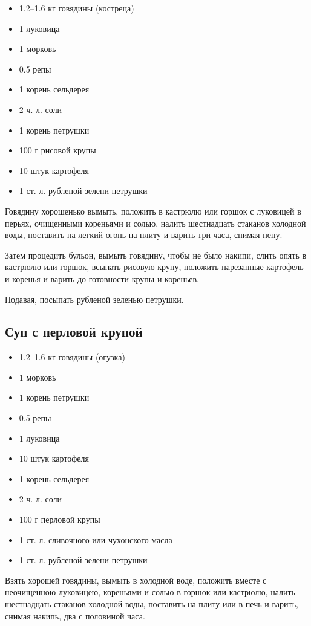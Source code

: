 \begin{itemize}
	\item 1.2–1.6 кг говядины (костреца) 
    \item 1 луковица  
    \item 1 морковь  
    \item 0.5 репы  
    \item 1 корень сельдерея  
    \item 2 ч. л. соли  
    \item 1 корень петрушки  
    \item 100 г рисовой крупы  
    \item 10 штук картофеля  
    \item 1 ст. л. рубленой зелени петрушки
\end{itemize}

Говядину хорошенько вымыть, положить в кастрюлю или горшок с луковицей в перьях, очищенными кореньями и солью, налить шестнадцать стаканов холодной воды, поставить на легкий огонь на плиту и варить три часа, снимая пену.

Затем процедить бульон, вымыть говядину, чтобы не было накипи, слить опять в кастрюлю или горшок, всыпать рисовую крупу, положить нарезанные картофель и коренья и варить до готовности крупы и кореньев.

Подавая, посыпать рубленой зеленью петрушки.

\subsection{Суп с перловой крупой}\label{12sup-perlov}

\begin{itemize}
	\item 1.2–1.6 кг говядины (огузка) 
	\item 1 морковь 
	\item 1 корень петрушки 
	\item 0.5 репы 
	\item 1 луковица 
	\item 10 штук картофеля 
	\item 1 корень сельдерея 
	\item 2 ч. л. соли 
	\item 100 г перловой крупы 
	\item 1 ст. л. сливочного или чухонского масла 
	\item 1 ст. л. рубленой зелени петрушки
\end{itemize}

Взять хорошей говядины, вымыть в холодной воде, положить вместе с неочищенною луковицею, кореньями и солью в горшок или кастрюлю, налить шестнадцать стаканов холодной воды, поставить на плиту или в печь и варить, снимая накипь, два с половиной часа.

